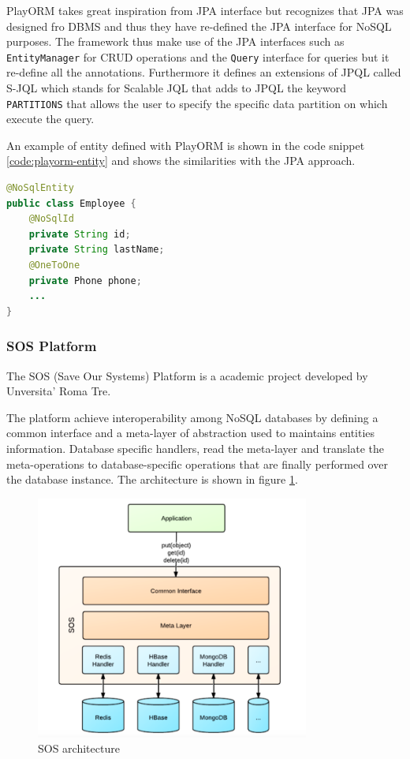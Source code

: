 \newparagraph PlayORM takes great inspiration from JPA interface but recognizes that JPA was designed fro DBMS and thus they have re-defined the JPA interface  for NoSQL purposes.
The framework thus make use of the JPA interfaces such as \texttt{EntityManager} for CRUD operations and the \texttt{Query} interface for queries but it re-define all the annotations.
Furthermore it defines an extensions of JPQL called S-JQL which stands for Scalable JQL that adds to JPQL the keyword \texttt{PARTITIONS} that allows the user to specify the specific data partition on which execute the query.

\noindent An example of entity defined with PlayORM is shown in the code snippet \ref{code:playorm-entity} and shows the similarities with the JPA approach.

\begin{lstlisting}[language=Java, caption=PlayORM object mapping, label=code:playorm-entity]
@NoSqlEntity
public class Employee {
    @NoSqlId
    private String id;
    private String lastName;
    @OneToOne
    private Phone phone;
    ...
}
\end{lstlisting}

\subsubsection{SOS Platform}
The SOS (Save Our Systems) Platform \cite{paper:sos-platform} is a academic project developed by Unversita' Roma Tre.

\noindent The platform achieve interoperability among NoSQL databases by defining a common interface  and a meta-layer of abstraction used to maintains entities information. Database specific handlers, read the meta-layer and translate the meta-operations to database-specific operations that are finally performed over the database instance.
The architecture is shown in figure \ref{fig:sos-architecture}.

\begin{figure}[tbh]
  \centering
  \includegraphics[width=9cm]{images/sos_architecture}
  \caption{SOS architecture \cite{paper:sos-platform}}
  \label{fig:sos-architecture}
\end{figure}

